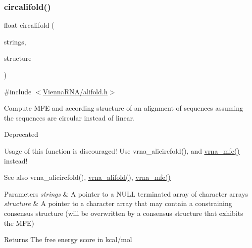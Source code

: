 \subsubsection{\texorpdfstring{circalifold()}{circalifold()}}
{\footnotesize\ttfamily float circalifold (\begin{DoxyParamCaption}\item[{const char $\ast$$\ast$}]{strings,  }\item[{char $\ast$}]{structure }\end{DoxyParamCaption})}



{\ttfamily \#include $<$\mbox{\hyperlink{alifold_8h}{Vienna\+R\+N\+A/alifold.\+h}}$>$}



Compute M\+FE and according structure of an alignment of sequences assuming the sequences are circular instead of linear. 

\begin{DoxyRefDesc}{Deprecated}
\item[\mbox{\hyperlink{deprecated__deprecated000013}{Deprecated}}]Usage of this function is discouraged! Use vrna\+\_\+alicircfold(), and \mbox{\hyperlink{group__mfe__fold_gabd3b147371ccf25c577f88bbbaf159fd}{vrna\+\_\+mfe()}} instead! \end{DoxyRefDesc}
\begin{DoxySeeAlso}{See also}
vrna\+\_\+alicircfold(), \mbox{\hyperlink{group__consensus__mfe__fold_ga6c9d3bef3e92c6d423ffac9f981418c1}{vrna\+\_\+alifold()}}, \mbox{\hyperlink{group__mfe__fold_gabd3b147371ccf25c577f88bbbaf159fd}{vrna\+\_\+mfe()}}
\end{DoxySeeAlso}

\begin{DoxyParams}{Parameters}
{\em strings} & A pointer to a N\+U\+LL terminated array of character arrays \\
\hline
{\em structure} & A pointer to a character array that may contain a constraining consensus structure (will be overwritten by a consensus structure that exhibits the M\+FE) \\
\hline
\end{DoxyParams}
\begin{DoxyReturn}{Returns}
The free energy score in kcal/mol 
\end{DoxyReturn}
\mbox{\label{group__consensus__mfe__fold_ga72095e4554b5d577250ea14c42acc49e}} 
